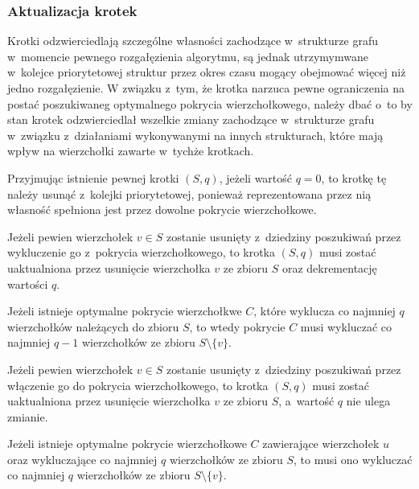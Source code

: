\subsubsection{\textbf{Aktualizacja krotek}}
\label{sss_ckx_updating_tuples}
\par{
  Krotki odzwierciedlają szczególne własności zachodzące w~strukturze grafu w~momencie pewnego rozgałęzienia algorytmu, są jednak utrzymymwane w~kolejce priorytetowej struktur przez okres czasu mogący obejmować więcej niż jedno rozgałęzienie.
  W związku z~tym, że krotka narzuca pewne ograniczenia na postać poszukiwaneg optymalnego pokrycia wierzchołkowego, należy dbać o~to by stan krotek odzwierciedlał wszelkie zmiany zachodzące w~strukturze grafu w~związku z~działaniami wykonywanymi na innych strukturach, które mają wpływ na wierzchołki zawarte w~tychże krotkach.
}
\par{
  Przyjmując istnienie pewnej krotki $(S, q)$, jeżeli wartość $q = 0$, to krotkę tę należy usunąć z~kolejki priorytetowej, ponieważ reprezentowana przez nią własność spełniona jest przez dowolne pokrycie wierzchołkowe.
  \begin{theorem}
    Jeżeli pewien wierzchołek $v \in S$ zostanie usunięty z~dziedziny poszukiwań przez wykluczenie go z~pokrycia wierzchołkowego, to krotka $(S, q)$ musi zostać uaktualniona przez usunięcie wierzchołka $v$ ze zbioru $S$ oraz dekrementację wartości $q$.
  \end{theorem}
  \begin{bproof}
    Jeżeli istnieje optymalne pokrycie wierzchołkwe $C$, które wyklucza co najmniej $q$ wierzchołków należących do zbioru $S$, to wtedy pokrycie $C$ musi wykluczać co najmniej $q-1$ wierzchołków ze zbioru $S \setminus \{v\}$.
  \end{bproof}
  \begin{theorem}
    Jeżeli pewien wierzchołek $v \in S$ zostanie usunięty z~dziedziny poszukiwań przez włączenie go do pokrycia wierzchołkowego, to krotka $(S, q)$ musi zostać uaktualniona przez usunięcie wierzchołka $v$ ze zbioru $S$, a~wartość $q$ nie ulega zmianie.
  \end{theorem}
  \begin{bproof}
    Jeżeli istnieje optymalne pokrycie wierzchołkowe $C$ zawierające wierzchołek $u$ oraz wykluczające co najmniej $q$ wierzchołków ze zbioru $S$, to musi ono wykluczać co najmniej $q$ wierzchołków ze zbioru $S \setminus \{v\}$.
  \end{bproof}
}
